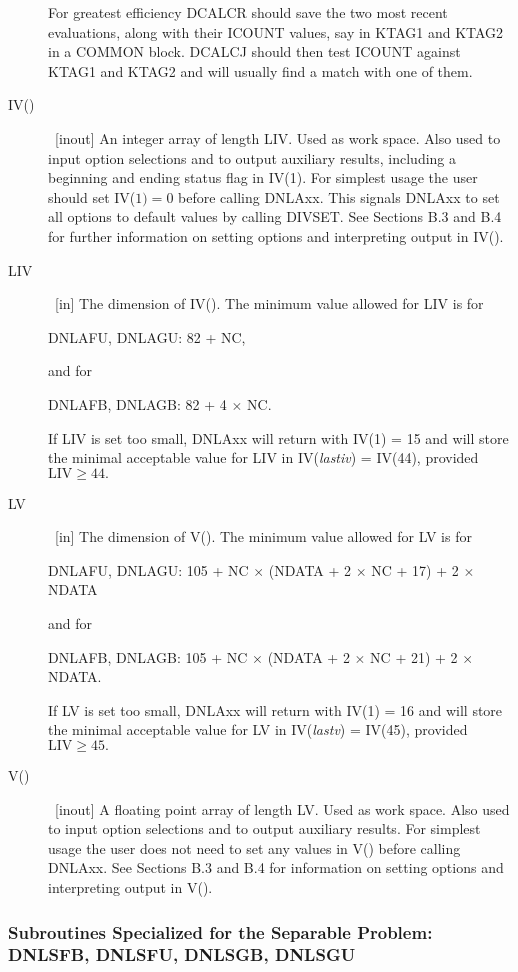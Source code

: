 \documentclass[twoside]{MATH77}
\begin{document}
\begin{description}
For greatest efficiency DCALCR should save the two most recent evaluations,
along with their ICOUNT values, say in KTAG1 and KTAG2 in a COMMON block.
DCALCJ should then test ICOUNT against KTAG1 and KTAG2 and will usually find
a match with one of them.

\item[IV()]  \ [inout] An integer array of length LIV. Used as work space.
Also used to input option selections and to output auxiliary results,
including a beginning and ending status flag in IV(1). For simplest usage
the user should set IV($1)=0$ before calling DNLAxx. This signals DNLAxx to
set all options to default values by calling DIVSET. See Sections B.3 and
B.4 for further information on setting options and interpreting output in
IV().

\item[LIV]  \ [in] The dimension of IV().  The minimum value allowed
for LIV is for

DNLAFU, DNLAGU: 82 + NC,

and for

DNLAFB, DNLAGB: 82 + 4 $\times $ NC.

If LIV is set too small, DNLAxx will return with IV(1) = 15 and will store
the minimal acceptable value for LIV in IV({\em lastiv}) = IV(44),
provided $\text{LIV} \geq 44.$

\item[LV]  \ [in] The dimension of V().  The minimum value allowed
for LV is for

DNLAFU, DNLAGU: 105 + NC $\times $ (NDATA + 2 $\times $ NC + 17)
+ 2 $\times $ NDATA

and for

DNLAFB, DNLAGB: 105 + NC $\times $ (NDATA + 2 $\times $ NC + 21)
+ 2 $\times $ NDATA.

If LV is set too small, DNLAxx will return with IV(1) = 16 and will store
the minimal acceptable value for LV in IV({\em lastv}) = IV(45),
provided $\text{LIV} \geq 45.$

\item[V()]  \ [inout] A floating point array of length LV. Used as work
space. Also used to input option selections and to output auxiliary results.
For simplest usage the user does not need to set any values in V() before
calling DNLAxx. See Sections B.3 and B.4 for information on setting options
and interpreting output in V().
\end{description}

\subsubsection{Subroutines Specialized for the Separable Problem: DNLSFB,
DNLSFU, DNLSGB, DNLSGU\label{PB2}}
\end{document}
